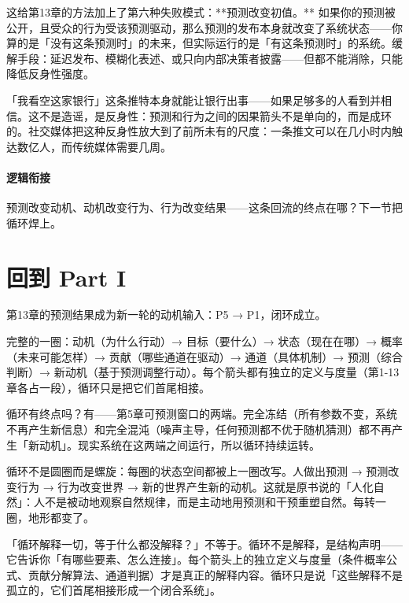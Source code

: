 \documentclass[../../main2.tex]{subfiles}
\begin{document}
	这给第13章的方法加上了第六种失败模式：**预测改变初值。** 如果你的预测被公开，且受众的行为受该预测驱动，那么预测的发布本身就改变了系统状态——你算的是「没有这条预测时」的未来，但实际运行的是「有这条预测时」的系统。缓解手段：延迟发布、模糊化表述、或只向内部决策者披露——但都不能消除，只能降低反身性强度。

	\begin{readingnote}
		「我看空这家银行」这条推特本身就能让银行出事——如果足够多的人看到并相信。这不是造谣，是反身性：预测和行为之间的因果箭头不是单向的，而是成环的。社交媒体把这种反身性放大到了前所未有的尺度：一条推文可以在几小时内触达数亿人，而传统媒体需要几周。
	\end{readingnote}

	\paragraph*{逻辑衔接}
	预测改变动机、动机改变行为、行为改变结果——这条回流的终点在哪？下一节把循环焊上。
	\section{回到 Part I}
	\label{sec:cl-return}
	第13章的预测结果成为新一轮的动机输入：P5 → P1，闭环成立。

	完整的一圈：动机（为什么行动）→ 目标（要什么）→ 状态（现在在哪）→ 概率（未来可能怎样）→ 贡献（哪些通道在驱动）→ 通道（具体机制）→ 预测（综合判断）→ 新动机（基于预测调整行动）。每个箭头都有独立的定义与度量（第1-13章各占一段），循环只是把它们首尾相接。

	循环有终点吗？有——第5章可预测窗口的两端。完全冻结（所有参数不变，系统不再产生新信息）和完全混沌（噪声主导，任何预测都不优于随机猜测）都不再产生「新动机」。现实系统在这两端之间运行，所以循环持续运转。

	循环不是圆圈而是螺旋：每圈的状态空间都被上一圈改写。人做出预测 → 预测改变行为 → 行为改变世界 → 新的世界产生新的动机。这就是原书说的「人化自然」：人不是被动地观察自然规律，而是主动地用预测和干预重塑自然。每转一圈，地形都变了。

	\begin{questionbox}
		「循环解释一切，等于什么都没解释？」不等于。循环不是解释，是结构声明——它告诉你「有哪些要素、怎么连接」。每个箭头上的独立定义与度量（条件概率公式、贡献分解算法、通道判据）才是真正的解释内容。循环只是说「这些解释不是孤立的，它们首尾相接形成一个闭合系统」。
	\end{questionbox}
\end{document}
